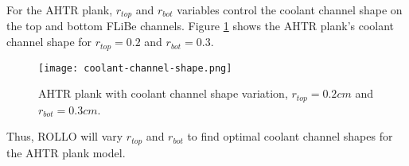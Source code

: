 For the \gls{AHTR} plank, $r_{top}$ and $r_{bot}$ variables control the coolant channel 
shape on the top and bottom \gls{FLiBe} channels. 
Figure \ref{fig:coolant-channel-shape} shows the \gls{AHTR} plank's coolant channel 
shape for $r_{top} = 0.2$ and $r_{bot} = 0.3$.
\begin{figure}[htbp]
    \centering
        \texttt{[image: coolant-channel-shape.png]}
    \raggedright
    \caption{\acrfull{AHTR} plank with coolant channel shape variation, $r_{top} 
    = 0.2cm$ and $r_{bot} = 0.3cm$.}  
    \label{fig:coolant-channel-shape}
\end{figure}
Thus, \gls{ROLLO} will vary $r_{top}$ and $r_{bot}$ to find optimal coolant 
channel shapes for the \gls{AHTR} plank model.

